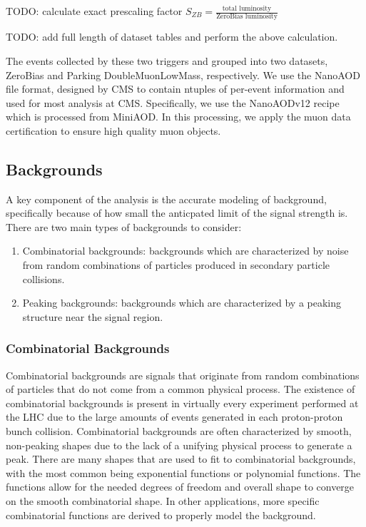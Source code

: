 TODO: calculate exact prescaling factor $S_{ZB} = \frac{\text{total luminosity}}{\text{ZeroBias luminosity}}$

TODO: add full length of dataset tables and perform the above calculation.

The events collected by these two triggers and grouped into two datasets, ZeroBias and Parking DoubleMuonLowMass, respectively. We use the NanoAOD file format, designed by CMS to contain ntuples of per-event information and used for most analysis at CMS. Specifically, we use the NanoAODv12 recipe which is processed from MiniAOD. In this processing, we apply the muon data certification to ensure high quality muon objects. 

\subsection{Backgrounds}
\label{subsec:backgrounds}

A key component of the analysis is the accurate modeling of background, specifically because of how small the anticpated limit of the signal strength is. There are two main types of backgrounds to consider: 
\begin{enumerate}
    \item Combinatorial backgrounds: backgrounds which are characterized by noise from random combinations of particles produced in secondary particle collisions. 
    \item Peaking backgrounds: backgrounds which are characterized by a peaking structure near the signal region.
\end{enumerate}

\subsubsection{Combinatorial Backgrounds}

Combinatorial backgrounds are signals that originate from random combinations of particles that do not come from a common physical process. The existence of combinatorial backgrounds is present in virtually every experiment performed at the LHC due to the large amounts of events generated in each proton-proton bunch collision. Combinatorial backgrounds are often characterized by smooth, non-peaking shapes due to the lack of a unifying physical process to generate a peak. There are many shapes that are used to fit to combinatorial backgrounds, with the most common being exponential functions or polynomial functions. The functions allow for the needed degrees of freedom and overall shape to converge on the smooth combinatorial shape. In other applications, more specific combinatorial functions are derived to properly model the background. 

